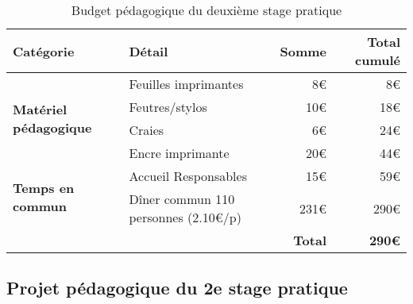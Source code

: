 \documentclass[titlepage,11pt,a4paper]{article}
\begin{document}
\begin{table}[!ht]
   \caption{\label{budgped} Budget pédagogique du deuxième stage pratique}
   \vspace{.5em}
   \begin{adjustbox}{center}
   \begin{tabular}{llrr}
      \toprule
      \textbf{Catégorie} & \textbf{Détail} & \textbf{Somme} & \textbf{Total cumulé} \\
      \toprule
      \multirow{4}{10em}{\textbf{Matériel pédagogique}} & Feuilles imprimantes & 8€ & 8€ \\
      & Feutres/stylos & 10€ & 18€ \\
      & Craies & 6€ & 24€ \\
      & Encre imprimante & 20€ & 44€ \\
      \midrule
      \multirow{2}{10em}{\textbf{Temps en commun}} & Accueil Responsables & 15€ & 59€ \\
      & Dîner commun 110 personnes (2.10€/p) & 231€ & 290€ \\
      \bottomrule
      &  & \textbf{Total} & \textbf{290€} \\
      \bottomrule
   \end{tabular}
\end{adjustbox}
\end{table}

\clearpage
\subsection{Projet pédagogique du 2e stage pratique}
\end{document}
